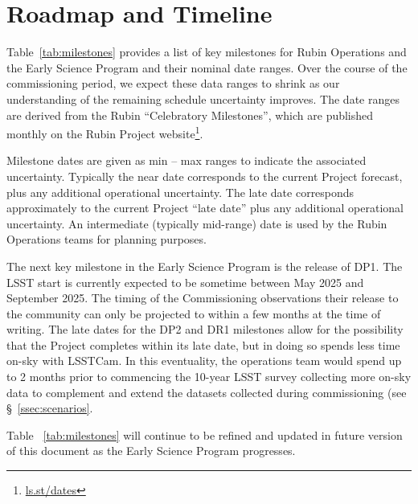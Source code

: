\section{Roadmap and Timeline} \label{sec:timeline}

Table~\ref{tab:milestones} provides a list of key milestones for Rubin Operations and the Early Science Program and their nominal date ranges.
Over the course of the commissioning period, we expect these data ranges to shrink as our understanding of the remaining schedule uncertainty improves. 
The date ranges are derived from the Rubin ``Celebratory Milestones'', which are  published monthly on the Rubin Project website\footnote{\url{ls.st/dates}}. 



Milestone dates are given as min -- max ranges to indicate the associated uncertainty. 
Typically the near date corresponds to the current Project forecast, plus any additional operational uncertainty.
The late date corresponds approximately to the current Project ``late date'' plus any additional operational uncertainty.
An intermediate (typically mid-range) date is used by the Rubin Operations teams for planning purposes. 

The next key milestone in the Early Science Program is the release of DP1.
The LSST start is currently expected to be sometime between May 2025 and September 2025.
The timing of the Commissioning observations their release to the community can only be projected to within a few months at the time of writing.
The late dates for the DP2 and DR1 milestones allow for the possibility that the Project completes within its late date, but in doing so spends less time on-sky with LSSTCam.
In this eventuality, the operations team would spend up to 2 months prior to commencing the 10-year LSST survey collecting more on-sky data to complement and extend the datasets collected during commissioning (see \S~\ref{ssec:scenarios}. 


%

Table ~\ref{tab:milestones} will continue to be refined and updated in future version of this document as the Early Science Program progresses.
